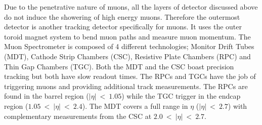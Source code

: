		Due to the penetrative nature of muons, all the layers of detector discussed above do not induce the showering of high energy muons. Therefore the outermost detector is another tracking detector specifically for muons. It uses the outer toroid magnet system to bend muon paths and measure muon momentum. The Muon Spectrometer is composed of 4 different technologies; Monitor Drift Tubes (MDT), Cathode Strip Chambers (CSC), Resistive Plate Chambers (RPC) and Thin Gap Chambers (TGC). Both the MDT and the CSC boast precision tracking but both have slow readout times. The RPCs and TGCs have the job of triggering muons and providing additional track measurements. The RPCs are found in the barrel region ($|\eta|~<~1.05$) while the TGC trigger in the endcap region ($1.05~<~|\eta|~<~2.4$). The MDT covers a full range in $\eta$ ($|\eta|~<~2.7$) with complementary measurements from the CSC at $2.0~<~|\eta|~<~2.7$.\\





